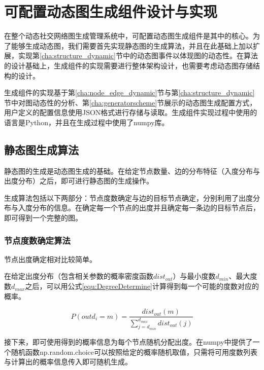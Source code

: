 
\chapter{可配置动态图生成组件设计与实现}
\label{cha:chapter03}

在整个动态社交网络图生成管理系统中，可配置动态图生成组件是其中的核心。为了能够生成动态图，我们需要首先实现静态图的生成算法，并且在此基础上加以扩展，实现第\ref{cha:structure_dynamic}节中的动态图事件以体现图的动态性。在算法的设计基础上，生成组件的实现需要进行整体架构设计，也需要考虑动态图存储结构的设计。

生成组件的实现基于第\ref{cha:node_edge_dynamic}节与第\ref{cha:structure_dynamic}节中对图动态性的分析、第\ref{cha:generatorscheme}节展示的动态图生成配置方式，用户定义的配置信息使用JSON格式进行存储与读取。生成组件实现过程中使用的语言是Python，并且在生成过程中使用了numpy库。

\section{静态图生成算法}
\label{cha:staticgraph}

静态图的生成是动态图生成的基础。在给定节点数量、边的分布特征（入度分布与出度分布）之后，即可进行静态图的生成操作。

生成算法包括以下两部分：节点度数确定与边的目标节点确定\cite{FastSGG}，分别利用了出度分布与入度分布的信息。在确定每一个节点的出度并且确定每一条边的目标节点后，即可得到一个完整的图。

\subsection{节点度数确定算法}

节点出度确定相对比较简单。

在给定出度分布（包含相关参数的概率密度函数$dist_{out}$）与最小度数$d_{min}$、最大度数$d_{max}$之后，可以用公式\ref{equ:DegreeDetermine}计算得到每一个可能的度数对应的概率。

\vspace{-8mm}

\begin{equation}
  \label{equ:DegreeDetermine}
  P\left(outd_i=m\right)=\frac{dist_{out}(m)}{\sum\limits_{j=d_{min}}^{d_{max}}dist_{out}(j)}
\end{equation}

接下来，即可使用得到的概率信息为每个节点随机分配出度。在numpy中提供了一个随机函数np.random.choice可以按照给定的概率随机取值，只需将可用度数列表与计算出的概率信息传入即可随机生成。

